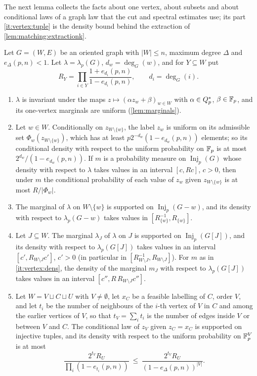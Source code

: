 The next lemma collects the facts about one vertex, about subsets and about
conditional laws of a graph law that the cut and spectral estimates use; its
part \ref{it:vertex:tuple} is the density bound behind the extraction of
\cref{lem:matching:extractionk}.

\begin{lemma}\label{lem:graphs:vertex}
Let $G=(W,E)$ be an oriented graph with $|W|\le n$, maximum degree $\Delta$ and
$e_\Delta(p,n)<1$. Let $\lambda=\lambda_p(G)$, $d_w=\deg_G(w)$, and for $Y\subseteq W$
put
\[
 R_Y=\prod_{i\in Y}\frac{1+e_{d_i}(p,n)}{1-e_{d_i}(p,n)},\qquad d_i=\deg_G(i).
\]
\begin{enumerate}[label=\textup{(\alph*)}]
\item\label{it:vertex:inv} $\lambda$ is invariant under the maps
 $z\mapsto(\alpha z_w+\beta)_{w\in W}$ with $\alpha\in Q_{p}^{*}$, $\beta\in\mathbb F_p$, and its
 one-vertex marginals are uniform (\cref{lem:marginals}).
\item\label{it:vertex:dens} Let $w\in W$. Conditionally on $z_{W\setminus\{w\}}$, the
 label $z_w$ is uniform on its admissible set $\Phi_w(z_{W\setminus\{w\}})$, which
 has at least $p2^{-d_w}(1-e_{d_w}(p,n))$ elements; so its conditional density
 with respect to the uniform probability on $\mathbb F_p$ is at most
  $2^{d_w}/(1-e_{d_w}(p,n))$. If $m$ is a probability measure on
  $\operatorname{Inj}_p(G)$ whose density with respect to $\lambda$ takes values in
  an interval $[c,Rc]$, $c>0$, then under $m$ the conditional probability of each
 value of $z_w$ given $z_{W\setminus\{w\}}$ is at most $R/|\Phi_w|$.
\item\label{it:vertex:del} The marginal of $\lambda$ on $W\setminus\{w\}$ is
 supported on $\operatorname{Inj}_p(G-w)$, and its density with respect to
 $\lambda_p(G-w)$ takes values in $[R_{\{w\}}^{-1},R_{\{w\}}]$.
\item\label{it:vertex:subset} Let $J\subseteq W$. The marginal $\lambda_J$ of
 $\lambda$ on $J$ is supported on $\operatorname{Inj}_p(G[J])$, and its density with
 respect to $\lambda_p(G[J])$ takes values in an interval $[c',R_{W\setminus J}c']$,
 $c'>0$ (in particular in $[R_{W\setminus J}^{-1},R_{W\setminus J}]$). For $m$ as in
 \ref{it:vertex:dens}, the density of the marginal $m_J$ with respect to
 $\lambda_p(G[J])$ takes values in an interval $[c'',R\,R_{W\setminus J}c'']$.
\item\label{it:vertex:tuple} Let $W=V\sqcup C\sqcup U$ with $V\ne\emptyset$, let $x_C$ be a
 feasible labelling of $C$, order $V$, and let $t_i$ be the number of
 neighbours of the $i$-th vertex of $V$ in $C$ and among the earlier vertices of
 $V$, so that $t_V=\sum_it_i$ is the number of edges inside $V$ or between $V$
 and $C$. The conditional law of $z_V$ given $z_C=x_C$ is supported on injective
 tuples, and its density with respect to the uniform probability on $\mathbb F_p^V$ is
 at most
 \[
  \frac{2^{t_V}R_U}{\prod_i(1-e_{t_i}(p,n))}\ \le\ \frac{2^{t_V}R_U}{(1-e_\Delta(p,n))^{|V|}} .
 \]
\end{enumerate}
\end{lemma}

